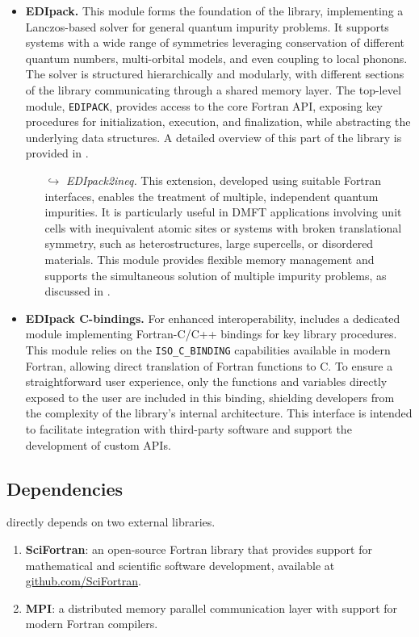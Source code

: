 \documentclass[edipack_sp.tex]{subfiles}
\begin{document}
\begin{itemize}
\item{\bf EDIpack.}
  This module forms the foundation of the library, implementing a 
  Lanczos-based solver for general quantum impurity problems. It 
  supports systems with a wide range of symmetries leveraging conservation of different quantum numbers, multi-orbital models, and even coupling to local 
  phonons. The \NAME solver is structured hierarchically and modularly, 
  with different sections of the library communicating through a shared 
  memory layer. The top-level module, {\tt EDIPACK}, provides access 
  to the core Fortran API, exposing key procedures for initialization, 
  execution, and finalization, while abstracting the underlying data 
  structures. A detailed overview of this part of the library is   provided in .
  \begin{itemize}
    \item[$\hookrightarrow$]
    {\it EDIpack2ineq.}
  This extension, developed using suitable Fortran interfaces,
  enables the treatment of multiple, independent quantum 
impurities. It is particularly useful in DMFT applications involving 
unit cells with inequivalent atomic sites or systems with broken 
translational symmetry, such as heterostructures, large supercells, 
or disordered materials. This module provides flexible memory 
management and supports the simultaneous solution of multiple impurity 
problems, as discussed in .
\end{itemize}


\item{\bf EDIpack C-bindings.}
  For enhanced interoperability, \NAME includes a dedicated module 
implementing Fortran-C/C++ bindings for key library procedures. This 
module relies on the {\tt ISO\_C\_BINDING} capabilities available in 
modern Fortran, allowing direct translation of Fortran functions to C. 
To ensure a straightforward user experience, only the functions and 
variables directly exposed to the user are included in this binding, 
shielding developers from the complexity of the library's internal 
architecture. This interface is intended to facilitate integration 
with third-party software and support the development of custom APIs.
\end{itemize}




\subsection{Dependencies}\label{sSecInstallDependencies}
\NAME directly depends on two external libraries.
\begin{enumerate}
\item {\bf SciFortran}: an open-source Fortran library that provides support
for mathematical and scientific software development, available at \href{https://github.com/SciFortran/SciFortran}{github.com/SciFortran}.
\item {\bf MPI}: a distributed memory parallel communication layer with support for modern Fortran compilers.
\end{enumerate}
 
\end{document}
